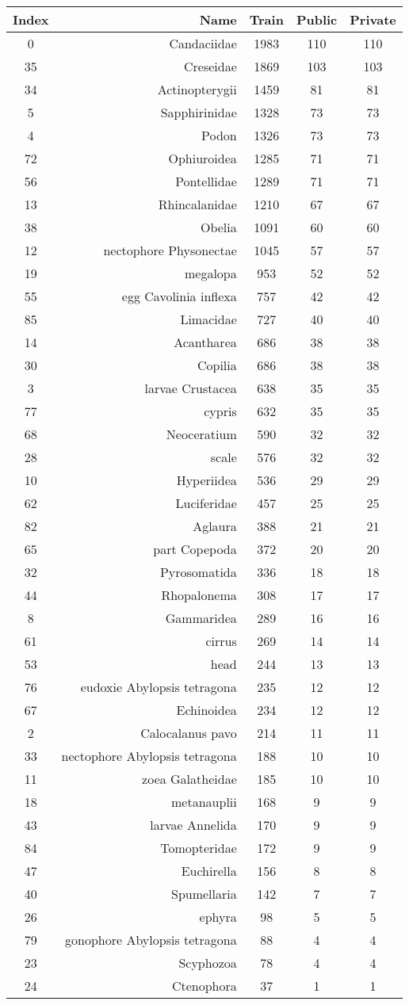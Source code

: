 \begin{tabular}{|c|r|c|c|c|}
Index & Name & Train & Public & Private\\
\hline0  & Candaciidae & 1983& 110& 110\\
35  & Creseidae & 1869& 103& 103\\
34  & Actinopterygii & 1459& 81& 81\\
5  & Sapphirinidae & 1328& 73& 73\\
4  & Podon & 1326& 73& 73\\
72  & Ophiuroidea & 1285& 71& 71\\
56  & Pontellidae & 1289& 71& 71\\
13  & Rhincalanidae & 1210& 67& 67\\
38  & Obelia & 1091& 60& 60\\
12  & nectophore  Physonectae & 1045& 57& 57\\
19  & megalopa & 953& 52& 52\\
55  & egg  Cavolinia inflexa & 757& 42& 42\\
85  & Limacidae & 727& 40& 40\\
14  & Acantharea & 686& 38& 38\\
30  & Copilia & 686& 38& 38\\
3  & larvae  Crustacea & 638& 35& 35\\
77  & cypris & 632& 35& 35\\
68  & Neoceratium & 590& 32& 32\\
28  & scale & 576& 32& 32\\
10  & Hyperiidea & 536& 29& 29\\
62  & Luciferidae & 457& 25& 25\\
82  & Aglaura & 388& 21& 21\\
65  & part  Copepoda & 372& 20& 20\\
32  & Pyrosomatida & 336& 18& 18\\
44  & Rhopalonema & 308& 17& 17\\
8  & Gammaridea & 289& 16& 16\\
61  & cirrus & 269& 14& 14\\
53  & head & 244& 13& 13\\
76  & eudoxie  Abylopsis tetragona & 235& 12& 12\\
67  & Echinoidea & 234& 12& 12\\
2  & Calocalanus pavo & 214& 11& 11\\
33  & nectophore  Abylopsis tetragona & 188& 10& 10\\
11  & zoea  Galatheidae & 185& 10& 10\\
18  & metanauplii & 168& 9& 9\\
43  & larvae  Annelida & 170& 9& 9\\
84  & Tomopteridae & 172& 9& 9\\
47  & Euchirella & 156& 8& 8\\
40  & Spumellaria & 142& 7& 7\\
26  & ephyra & 98& 5& 5\\
79  & gonophore  Abylopsis tetragona & 88& 4& 4\\
23  & Scyphozoa & 78& 4& 4\\
24  & Ctenophora & 37& 1& 1\\
\hline
\end{tabular}

